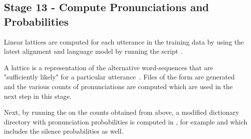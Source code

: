 \subsection{ Stage 13 - Compute Pronunciations and Probabilities}
Linear lattices are computed for each utterance in the training data  by using the latest alignment  and language model  by running the script .

A lattice is a representation of the alternative word-sequences that are "sufficiently likely" for a particular utterance~\cite{kaldilattice}. Files of the form  are generated and the various counts of pronunciations are computed which are used in the next step in this stage.

Next, by running the  on the counts obtained from above, a modified dictionary directory with pronunciation probabilities is computed in , for example  and  which includes the silence probabilities as well.